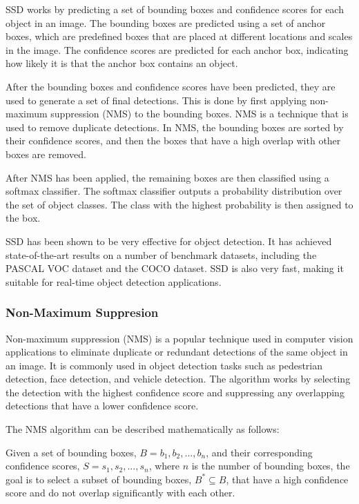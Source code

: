 \documentclass[final,rdr32.tex]{subfiles}
\begin{document}
SSD works by predicting a set of bounding boxes and confidence scores for each object in an image. The bounding boxes are predicted using a set of anchor boxes, which are predefined boxes that are placed at different locations and scales in the image. The confidence scores are predicted for each anchor box, indicating how likely it is that the anchor box contains an object.

After the bounding boxes and confidence scores have been predicted, they are used to generate a set of final detections. This is done by first applying non-maximum suppression (NMS) to the bounding boxes. NMS is a technique that is used to remove duplicate detections. In NMS, the bounding boxes are sorted by their confidence scores, and then the boxes that have a high overlap with other boxes are removed.

After NMS has been applied, the remaining boxes are then classified using a softmax classifier. The softmax classifier outputs a probability distribution over the set of object classes. The class with the highest probability is then assigned to the box.

SSD has been shown to be very effective for object detection. It has achieved state-of-the-art results on a number of benchmark datasets, including the PASCAL VOC dataset and the COCO dataset. SSD is also very fast, making it suitable for real-time object detection applications.

\subsubsection{Non-Maximum Suppresion}

Non-maximum suppression (NMS) is a popular technique used in computer vision applications to eliminate duplicate or redundant detections of the same object in an image. It is commonly used in object detection tasks such as pedestrian detection, face detection, and vehicle detection. The algorithm works by selecting the detection with the highest confidence score and suppressing any overlapping detections that have a lower confidence score.

The NMS algorithm can be described mathematically as follows:

Given a set of bounding boxes, $B = {b_1, b_2, ..., b_n}$, and their corresponding confidence scores, $S = {s_1, s_2, ..., s_n}$, where $n$ is the number of bounding boxes, the goal is to select a subset of bounding boxes, $B^* \subseteq B$, that have a high confidence score and do not overlap significantly with each other.
\end{document}
